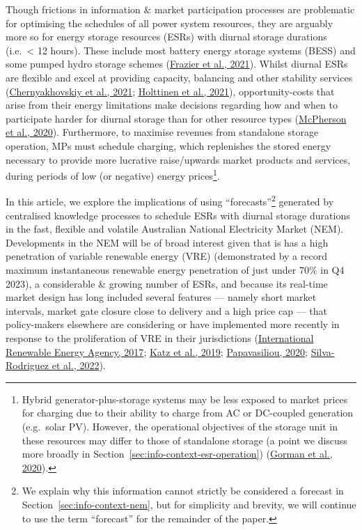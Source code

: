 \documentclass[12pt,a4paper,]{report}
\begin{document}
Though frictions in information \& market participation processes are
problematic for optimising the schedules of all power system resources,
they are arguably more so for energy storage resources (ESRs) with
diurnal storage durations (i.e.~\textless{} 12 hours). These include
most battery energy storage systems (BESS) and some pumped hydro storage
schemes (\protect\hyperlink{ref-frazierStorageFuturesStudy2021}{Frazier
et al., 2021}). Whilst diurnal ESRs are flexible and excel at providing
capacity, balancing and other stability services
(\protect\hyperlink{ref-chernyakhovskiyUSAIDEnergyStorage2021}{Chernyakhovskiy
et al., 2021};
\protect\hyperlink{ref-holttinenDesignOperationEnergy2021}{Holttinen et
al., 2021}), opportunity-costs that arise from their energy limitations
make decisions regarding how and when to participate harder for diurnal
storage than for other resource types
(\protect\hyperlink{ref-mcphersonImpactsStorageDispatch2020}{McPherson
et al., 2020}). Furthermore, to maximise revenues from standalone
storage operation, MPs must schedule charging, which replenishes the
stored energy necessary to provide more lucrative raise/upwards market
products and services, during periods of low (or negative) energy
prices\footnote{Hybrid generator-plus-storage systems may be less
  exposed to market prices for charging due to their ability to charge
  from AC or DC-coupled generation (e.g.~solar PV). However, the
  operational objectives of the storage unit in these resources may
  differ to those of standalone storage (a point we discuss more broadly
  in Section~\ref{sec:info-context-esr-operation})
  (\protect\hyperlink{ref-gormanMotivationsOptionsDeploying2020}{Gorman
  et al., 2020}).}.

In this article, we explore the implications of using
``forecasts''\footnote{We explain why this information cannot strictly
  be considered a forecast in Section~\ref{sec:info-context-nem}, but
  for simplicity and brevity, we will continue to use the term
  ``forecast'' for the remainder of the paper.} generated by centralised
knowledge processes to schedule ESRs with diurnal storage durations in
the fast, flexible and volatile Australian National Electricity Market
(NEM). Developments in the NEM will be of broad interest given that is
has a high penetration of variable renewable energy (VRE) (demonstrated
by a record maximum instantaneous renewable energy penetration of just
under 70\% in Q4 2023), a considerable \& growing number of ESRs, and
because its real-time market design has long included several features
--- namely short market intervals, market gate closure close to delivery
and a high price cap --- that policy-makers elsewhere are considering or
have implemented more recently in response to the proliferation of VRE
in their jurisdictions
(\protect\hyperlink{ref-internationalrenewableenergyagencyAdaptingMarketDesign2017}{International
Renewable Energy Agency, 2017};
\protect\hyperlink{ref-katzOpeningMarketsDesigning2019}{Katz et al.,
2019};
\protect\hyperlink{ref-papavasiliouScarcityPricingMissing2020}{Papavasiliou,
2020};
\protect\hyperlink{ref-silva-rodriguezShortTermWholesale2022}{Silva-Rodriguez
et al., 2022}).
\end{document}
